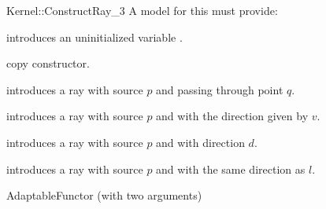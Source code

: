 \begin{ccRefFunctionObjectConcept}{Kernel::ConstructRay_3}
A model for this must provide:



\ccHidden {}
             {introduces an uninitialized variable .}

\ccHidden {}
            {copy constructor.}

            {introduces a ray  
             with source $p$ and passing through point $q$.}

            {introduces a ray with source $p$ and with 
             the direction given by $v$.}

            {introduces a ray with source $p$ and with 
             direction $d$.}

            {introduces a ray with source $p$ and with 
             the same direction as $l$.}

\ccRefines
AdaptableFunctor (with two arguments)

\ccSeeAlso
{}\\

\end{ccRefFunctionObjectConcept}
